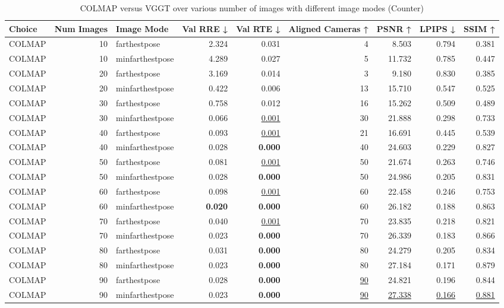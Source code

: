 \begin{table}[H]
\caption{COLMAP versus VGGT over various number of images with different image modes (Counter)}
\label{tab:01_num_images_image_mode_counter}
\centering
\scriptsize
\begin{tabular}{lrlrrrrrr}
\toprule
Choice & Num Images & Image Mode & Val RRE ↓ & Val RTE ↓ & Aligned Cameras ↑ & PSNR ↑ & LPIPS ↓ & SSIM ↑ \\
\midrule
COLMAP & 10 & farthestpose & 2.324 & 0.031 & 4 & 8.503 & 0.794 & 0.381 \\
COLMAP & 10 & minfarthestpose & 4.289 & 0.027 & 5 & 11.732 & 0.785 & 0.447 \\
COLMAP & 20 & farthestpose & 3.169 & 0.014 & 3 & 9.180 & 0.830 & 0.385 \\
COLMAP & 20 & minfarthestpose & 0.422 & 0.006 & 13 & 15.710 & 0.547 & 0.525 \\
COLMAP & 30 & farthestpose & 0.758 & 0.012 & 16 & 15.262 & 0.509 & 0.489 \\
COLMAP & 30 & minfarthestpose & 0.066 & \underline{0.001} & 30 & 21.888 & 0.298 & 0.733 \\
COLMAP & 40 & farthestpose & 0.093 & \underline{0.001} & 21 & 16.691 & 0.445 & 0.539 \\
COLMAP & 40 & minfarthestpose & 0.028 & \textbf{0.000} & 40 & 24.603 & 0.229 & 0.827 \\
COLMAP & 50 & farthestpose & 0.081 & \underline{0.001} & 50 & 21.674 & 0.263 & 0.746 \\
COLMAP & 50 & minfarthestpose & 0.028 & \textbf{0.000} & 50 & 24.986 & 0.205 & 0.831 \\
COLMAP & 60 & farthestpose & 0.098 & \underline{0.001} & 60 & 22.458 & 0.246 & 0.753 \\
COLMAP & 60 & minfarthestpose & \textbf{0.020} & \textbf{0.000} & 60 & 26.182 & 0.188 & 0.863 \\
COLMAP & 70 & farthestpose & 0.040 & \underline{0.001} & 70 & 23.835 & 0.218 & 0.821 \\
COLMAP & 70 & minfarthestpose & 0.023 & \textbf{0.000} & 70 & 26.339 & 0.183 & 0.866 \\
COLMAP & 80 & farthestpose & 0.031 & \textbf{0.000} & 80 & 24.279 & 0.205 & 0.834 \\
COLMAP & 80 & minfarthestpose & 0.023 & \textbf{0.000} & 80 & 27.184 & 0.171 & 0.879 \\
COLMAP & 90 & farthestpose & 0.028 & \textbf{0.000} & \underline{90} & 24.821 & 0.196 & 0.844 \\
COLMAP & 90 & minfarthestpose & 0.023 & \textbf{0.000} & \underline{90} & \underline{27.338} & \underline{0.166} & \underline{0.881} \\

\end{tabular}
\end{table}
